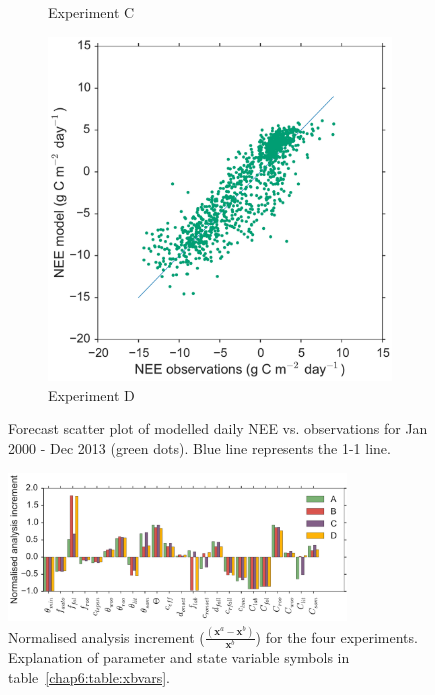 \begin{figure}
\begin{subfigure}[b]{0.4\textwidth}
        \caption{Experiment C}
        \label{chap6:fig:forecastscatBcorR}
    \end{subfigure}
    \begin{subfigure}[b]{0.4\textwidth}
        \includegraphics[width=\textwidth]{chapter/chapter6/Dfscat2.pdf}
        \caption{Experiment D}
        \label{chap6:fig:forecastscatedcBcorR}
    \end{subfigure}
    \caption{Forecast scatter plot of modelled daily NEE vs. observations for Jan 2000 - Dec 2013 (green dots). Blue line represents the 1-1 line.}\label{chap6:fig:animals}
\end{figure}

\begin{figure}[ht]
    \centering
    \includegraphics[width=0.8\textwidth]{chapter/chapter6/inccvt2.pdf}
    \caption{Normalised analysis increment \big($\frac{(\textbf{x}^a - \textbf{x}^b)}{\textbf{x}^b}$\big) for the four experiments. Explanation of parameter and state variable symbols in table~\ref{chap6:table:xbvars}.}
    \label{chap6:fig:xa_inc}
\end{figure}

